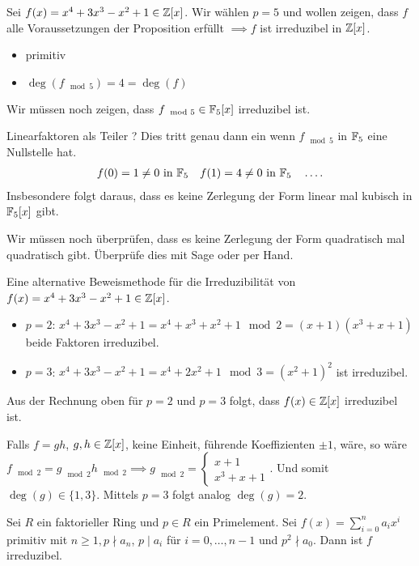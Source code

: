 \begin{eg}
	Sei $f(x) = x^{4} + 3x^3 - x^2 +1 \in \mathbb{Z}[x]$.
	Wir wählen $p = 5$ und wollen zeigen, dass $f$ alle Voraussetzungen der Proposition erfüllt $\implies f$ ist irreduzibel in $\mathbb{Z}[x]$.
	\begin{itemize}
		\item primitiv \checkmark
		\item $\deg(f_{\mod 5}) = 4 = \deg(f)$ \checkmark
	\end{itemize}
	Wir müssen noch zeigen, dass $f_{\mod 5} \in \mathbb{F}_{5}[x]$ irreduzibel ist.

	Linearfaktoren als Teiler ? Dies tritt genau dann ein wenn $f_{\mod 5}$ in $\mathbb{F}_{5}$ eine Nullstelle hat.
	\begin{align*}
		f(0) = 1 \neq 0 \text{ in } \mathbb{F}_{5} \quad f(1) = 4 \neq 0 \text{ in } \mathbb{F}_{5} \quad \ldots
	.\end{align*}
	Insbesondere folgt daraus, dass es keine Zerlegung der Form linear mal kubisch in $\mathbb{F}_{5}[x]$ gibt.

	Wir müssen noch überprüfen, dass es keine Zerlegung der Form quadratisch mal quadratisch gibt.
	Überprüfe dies mit Sage oder per Hand.

	Eine alternative Beweismethode für die Irreduzibilität von $f(x) = x^{4} + 3 x^3 - x^2 + 1 \in \mathbb{Z}[x]$.
	\begin{itemize}
		\item $p = 2$: $x^{4} + 3x^3 - x^2 + 1 = x^{4} + x^3 + x^2 + 1 \mod 2 = (x+1)(x^3 + x + 1)$ beide Faktoren irreduzibel.
		\item $p=3$: $x^{4} + 3x^3 - x^2 + 1 = x^{4} + 2x^2 + 1 \mod 3 = (x^2 +1)^2$ ist irreduzibel.
	\end{itemize}
	\begin{claim}
		Aus der Rechnung oben für $p=2$ und $p=3$ folgt, dass $f(x) \in \mathbb{Z}[x]$ irreduzibel ist.
	\end{claim}
	Falls $f = gh$, $g,h \in \mathbb{Z}[x]$, keine Einheit, führende Koeffizienten $\pm 1$, wäre, so wäre 
	$f_{\mod 2} = g_{\mod 2} h_{\mod 2} \implies g_{\mod 2} = \begin{cases}
		x+1\\ x^3+x+1
	\end{cases}$. Und somit $\deg(g) \in \{1,3\}$. Mittels $p=3$ folgt analog $\deg(g) = 2$. \contra
\end{eg}

\begin{theorem}
	Sei $R$ ein faktorieller Ring und $p \in R$ ein Primelement.
	Sei $f(x) = \sum_{i=0}^{n} a_{i} x^{i}$  primitiv mit $n \geq 1, p \nmid a_{n}$, $p \mid a_{i}$ für $i = 0,\ldots,n-1$ und $p^2 \nmid a_0$.
	Dann ist $f$ irreduzibel.
\end{theorem}

